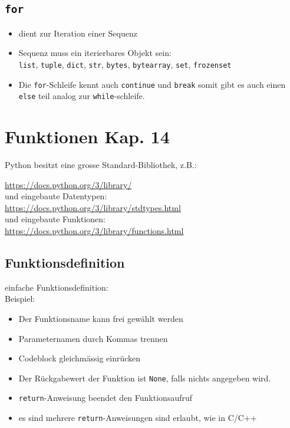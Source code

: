 \subsection{\texttt{for}}

\begin{itemize}
	\item dient zur Iteration einer Sequenz
	\item Sequenz muss ein iterierbares Objekt sein:\\
	\texttt{list}, \texttt{tuple}, \texttt{dict}, \texttt{str}, \texttt{bytes}, \texttt{bytearray}, \texttt{set}, \texttt{frozenset}
	\item Die \texttt{for}-Schleife kennt auch \texttt{continue} und \texttt{break} somit gibt es auch einen \texttt{else} teil analog zur \texttt{while}-schleife.
\end{itemize}



\section[Funktionen]{Funktionen \tiny{Kap. 14}}
Python besitzt eine grosse Standard-Bibliothek, z.B.:

\url{https://docs.python.org/3/library/}\\

und eingebaute Datentypen:\\
\url{https://docs.python.org/3/library/stdtypes.html}\\

und eingebaute Funktionen:\\
\url{https://docs.python.org/3/library/functions.html}

\subsection{Funktionsdefinition}
einfache Funktionsdefinition:\\


Beispiel:\\


\begin{itemize}
	\item Der Funktionsname kann frei gewählt werden
	\item Parameternamen durch Kommas trennen
	\item Codeblock gleichmässig einrücken
	\item Der Rückgabewert der Funktion ist \texttt{None}, falls nichts angegeben wird.
	\item \texttt{return}-Anweisung beendet den Funktionsaufruf
	\item es sind mehrere \texttt{return}-Anweisungen sind erlaubt, wie in C/C++
\end{itemize}

